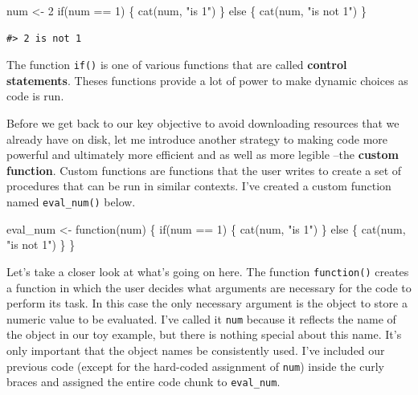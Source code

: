\documentclass[
  letterpaper,
]{scrbook}
\newenvironment{Shaded}{\begin{snugshade}}{\end{snugshade}}
\newcommand{\ControlFlowTok}[1]{\textcolor[rgb]{0.00,0.00,0.00}{#1}}
\newcommand{\DecValTok}[1]{\textcolor[rgb]{0.00,0.00,0.00}{#1}}
\newcommand{\FunctionTok}[1]{\textcolor[rgb]{0.00,0.00,0.00}{#1}}
\newcommand{\NormalTok}[1]{\textcolor[rgb]{0.00,0.00,0.00}{#1}}
\newcommand{\OtherTok}[1]{\textcolor[rgb]{0.00,0.00,0.00}{#1}}
\newcommand{\SpecialCharTok}[1]{\textcolor[rgb]{0.00,0.00,0.00}{#1}}
\newcommand{\StringTok}[1]{\textcolor[rgb]{0.00,0.00,0.00}{#1}}
\begin{document}
\begin{Shaded}
\begin{Highlighting}[]
\NormalTok{num }\OtherTok{\textless{}{-}} \DecValTok{2}
\ControlFlowTok{if}\NormalTok{(num }\SpecialCharTok{==} \DecValTok{1}\NormalTok{) \{ }
  \FunctionTok{cat}\NormalTok{(num, }\StringTok{"is 1"}\NormalTok{) }
\NormalTok{  \} }\ControlFlowTok{else}\NormalTok{ \{}
  \FunctionTok{cat}\NormalTok{(num, }\StringTok{"is not 1"}\NormalTok{)}
\NormalTok{  \}}
\end{Highlighting}
\end{Shaded}

\begin{verbatim}
#> 2 is not 1
\end{verbatim}

The function \texttt{if()} is one of various functions that are called
\textbf{control statements}. Theses functions provide a lot of power to
make dynamic choices as code is run.

Before we get back to our key objective to avoid downloading resources
that we already have on disk, let me introduce another strategy to
making code more powerful and ultimately more efficient and as well as
more legible --the \textbf{custom function}. Custom functions are
functions that the user writes to create a set of procedures that can be
run in similar contexts. I've created a custom function named
\texttt{eval\_num()} below.

\begin{Shaded}
\begin{Highlighting}[]
\NormalTok{eval\_num }\OtherTok{\textless{}{-}} \ControlFlowTok{function}\NormalTok{(num) \{}
  \ControlFlowTok{if}\NormalTok{(num }\SpecialCharTok{==} \DecValTok{1}\NormalTok{) \{ }
  \FunctionTok{cat}\NormalTok{(num, }\StringTok{"is 1"}\NormalTok{) }
\NormalTok{  \} }\ControlFlowTok{else}\NormalTok{ \{}
  \FunctionTok{cat}\NormalTok{(num, }\StringTok{"is not 1"}\NormalTok{)}
\NormalTok{  \}}
\NormalTok{\}}
\end{Highlighting}
\end{Shaded}

Let's take a closer look at what's going on here. The function
\texttt{function()} creates a function in which the user decides what
arguments are necessary for the code to perform its task. In this case
the only necessary argument is the object to store a numeric value to be
evaluated. I've called it \texttt{num} because it reflects the name of
the object in our toy example, but there is nothing special about this
name. It's only important that the object names be consistently used.
I've included our previous code (except for the hard-coded assignment of
\texttt{num}) inside the curly braces and assigned the entire code chunk
to \texttt{eval\_num}.
\end{document}
